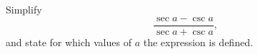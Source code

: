 Simplify
\[\dfrac{\sec a-\csc a}{\sec a+\csc a},\]
and state for which values of $a$ the expression is defined.
